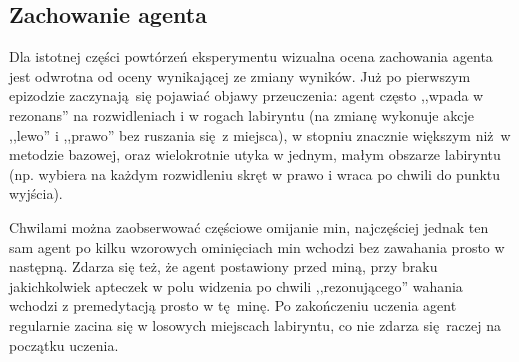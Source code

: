\documentclass[polish,master,a4paper,oneside]{ppfcmthesis}
\begin{document}
\begin{figure}[H]
\end{figure}

\begin{figure}[H]
\end{figure}

\subsection {Zachowanie agenta}
Dla istotnej części powtórzeń eksperymentu wizualna ocena zachowania agenta jest odwrotna od oceny wynikającej ze zmiany wyników. Już po pierwszym epizodzie zaczynają się pojawiać objawy przeuczenia: agent często ,,wpada w rezonans'' na rozwidleniach i w rogach labiryntu (na zmianę wykonuje akcje ,,lewo'' i ,,prawo'' bez ruszania się z miejsca), w stopniu znacznie większym niż w metodzie bazowej, oraz wielokrotnie utyka w jednym, małym obszarze labiryntu (np. wybiera na każdym rozwidleniu skręt w prawo i wraca po chwili do punktu wyjścia).

Chwilami można zaobserwować częściowe omijanie min, najczęściej jednak ten sam agent po kilku wzorowych ominięciach min wchodzi bez zawahania prosto w następną. Zdarza się też, że agent postawiony przed miną, przy braku jakichkolwiek apteczek w polu widzenia po chwili ,,rezonującego'' wahania wchodzi z premedytacją prosto w tę minę. Po zakończeniu uczenia agent regularnie zacina się w losowych miejscach labiryntu, co nie zdarza się raczej na początku uczenia.
\end{document}
